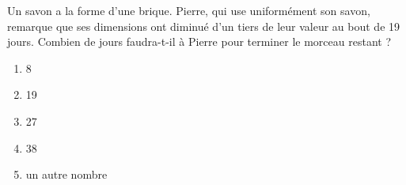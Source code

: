 Un savon a la forme d'une brique. Pierre, qui use uniformément son
savon, remarque que ses dimensions ont diminué d'un tiers de leur
valeur au bout de 19 jours. Combien de jours faudra-t-il à Pierre pour
terminer le morceau restant ?
\begin{multicols}{5}
  \begin{enumerate}[A/]
  \item 8
  \item 19
  \item 27
  \item 38
  \item un autre nombre
  \end{enumerate}
\end{multicols}
